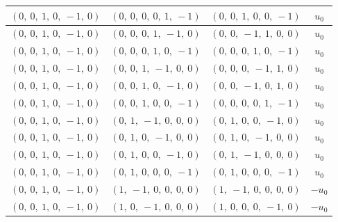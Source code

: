 \documentclass[11pt]{article}
\theoremstyle{definition}
\begin{document}
\begin{longtable}{|l|l|l|c|}
    \hline
    $\left( 0, \  0, \  1, \  0, \  -1, \  0\right)$ & $\left( 0, \  0, \  0, \  0, \  1, \  -1\right)$ & $\left( 0, \  0, \  1, \  0, \  0, \  -1\right)$ & $u_{0}$ \\
    \hline
    $\left( 0, \  0, \  1, \  0, \  -1, \  0\right)$ & $\left( 0, \  0, \  0, \  1, \  -1, \  0\right)$ & $\left( 0, \  0, \  -1, \  1, \  0, \  0\right)$ & $u_{0}$ \\
    \hline
    $\left( 0, \  0, \  1, \  0, \  -1, \  0\right)$ & $\left( 0, \  0, \  0, \  1, \  0, \  -1\right)$ & $\left( 0, \  0, \  0, \  1, \  0, \  -1\right)$ & $u_{0}$ \\
    \hline
    $\left( 0, \  0, \  1, \  0, \  -1, \  0\right)$ & $\left( 0, \  0, \  1, \  -1, \  0, \  0\right)$ & $\left( 0, \  0, \  0, \  -1, \  1, \  0\right)$ & $u_{0}$ \\
    \hline
    $\left( 0, \  0, \  1, \  0, \  -1, \  0\right)$ & $\left( 0, \  0, \  1, \  0, \  -1, \  0\right)$ & $\left( 0, \  0, \  -1, \  0, \  1, \  0\right)$ & $u_{0}$ \\
    \hline
    $\left( 0, \  0, \  1, \  0, \  -1, \  0\right)$ & $\left( 0, \  0, \  1, \  0, \  0, \  -1\right)$ & $\left( 0, \  0, \  0, \  0, \  1, \  -1\right)$ & $u_{0}$ \\
    \hline
    $\left( 0, \  0, \  1, \  0, \  -1, \  0\right)$ & $\left( 0, \  1, \  -1, \  0, \  0, \  0\right)$ & $\left( 0, \  1, \  0, \  0, \  -1, \  0\right)$ & $u_{0}$ \\
    \hline
    $\left( 0, \  0, \  1, \  0, \  -1, \  0\right)$ & $\left( 0, \  1, \  0, \  -1, \  0, \  0\right)$ & $\left( 0, \  1, \  0, \  -1, \  0, \  0\right)$ & $u_{0}$ \\
    \hline
    $\left( 0, \  0, \  1, \  0, \  -1, \  0\right)$ & $\left( 0, \  1, \  0, \  0, \  -1, \  0\right)$ & $\left( 0, \  1, \  -1, \  0, \  0, \  0\right)$ & $u_{0}$ \\
    \hline
    $\left( 0, \  0, \  1, \  0, \  -1, \  0\right)$ & $\left( 0, \  1, \  0, \  0, \  0, \  -1\right)$ & $\left( 0, \  1, \  0, \  0, \  0, \  -1\right)$ & $u_{0}$ \\
    \hline
    $\left( 0, \  0, \  1, \  0, \  -1, \  0\right)$ & $\left( 1, \  -1, \  0, \  0, \  0, \  0\right)$ & $\left( 1, \  -1, \  0, \  0, \  0, \  0\right)$ & $- u_{0}$ \\
    \hline
    $\left( 0, \  0, \  1, \  0, \  -1, \  0\right)$ & $\left( 1, \  0, \  -1, \  0, \  0, \  0\right)$ & $\left( 1, \  0, \  0, \  0, \  -1, \  0\right)$ & $- u_{0}$ \\

\end{longtable}
\end{document}
